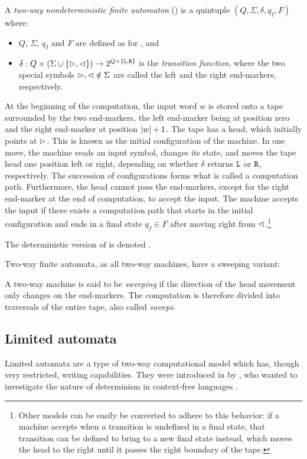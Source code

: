 \begin{defn}
	A \emph{two-way nondeterministic finite automaton} (\TNFA) is a quintuple $(Q,\Sigma,\delta,q_I,F)$ where:
	\begin{itemize}
		\item $Q$, $\Sigma$, $q_I$ and $F$ are defined as for \ONFAs, and
		\item $\delta:Q\times(\Sigma\cup\{\rhd,\lhd\})\to2^{Q\times\{\mathtt L,\mathtt R\}}$ is the \emph{transition function}, where the two special symbols $\rhd,\lhd\notin\Sigma$ are called the left and the right end-markers, respectively.
	\end{itemize}
	At the beginning of the computation, the input word $w$ is stored onto a tape surrounded by the two end-markers, the left end-marker being at position zero and the right end-marker at position $\lvert w \rvert+1$.
	The tape has a head, which initially points at $\rhd$.
	This is known as the initial configuration of the machine.
	In one move, the machine reads an input symbol, changes its state, and moves the tape head one position left or right, depending on whether $\delta$ returns $\mathtt L$ or $\mathtt R$, respectively.
	The succession of configurations forms what is called a computation path.
	Furthermore, the head cannot pass the end-markers, except for the right end-marker at the end of computation, to accept the input.
	The machine accepts the input if there exists a computation path that starts in the initial configuration and ends in a final state $q_f\in F$ after moving right from $\lhd$.\footnote{%
	Other models can be easily be converted to adhere to this behavior: if a machine accepts when a transition is undefined in a final state, that transition can be defined to bring to a new final state instead, which moves the head to the right until it passes the right boundary of the tape.}

	\noindent The deterministic version of \TNFA is denoted \TDFA.
\end{defn}

Two-way finite automata, as all two-way machines, have a sweeping variant:
\begin{defn}\label{def:sweeping}
	A two-way machine is said to be \emph{sweeping} if the direction of the head movement only changes on the end-markers.
	The computation is therefore divided into traversals of the entire tape, also called \emph{sweeps}.
\end{defn}


\subsection{Limited automata}
Limited automata are a type of two-way computational model which has, though very restricted, writing capabilities.
They were introduced in \citeyear{Hib67} by \citeauthor{Hib67}, who wanted to investigate the nature of determinism in context-free languages \cite{Hib67}.

